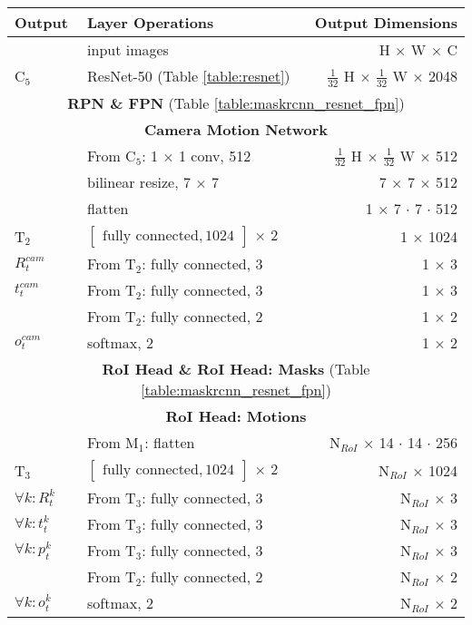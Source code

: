 {
\begin{table}[h]
\centering
\begin{tabular}{llr}
\toprule
\textbf{Output} & \textbf{Layer Operations} & \textbf{Output Dimensions} \\
\midrule\midrule
& input images & H $\times$ W $\times$ C \\
\midrule
C$_5$ & ResNet-50 (Table \ref{table:resnet}) & $\tfrac{1}{32}$ H $\times$ $\tfrac{1}{32}$ W $\times$ 2048 \\
\midrule
\multicolumn{3}{c}{\textbf{RPN \& FPN} (Table \ref{table:maskrcnn_resnet_fpn})} \\
\midrule
\multicolumn{3}{c}{\textbf{Camera Motion Network}}\\
\midrule
& From C$_5$: 1 $\times$ 1 conv, 512 & $\tfrac{1}{32}$ H $\times$ $\tfrac{1}{32}$ W $\times$ 512 \\
& bilinear resize, 7 $\times$ 7 & 7 $\times$ 7 $\times$ 512 \\
& flatten & 1 $\times$ 7 $\cdot$ 7 $\cdot$ 512 \\
T$_2$ & $\begin{bmatrix}\textrm{fully connected}, 1024\end{bmatrix}$ $\times$ 2  & 1 $\times$ 1024 \\
$R_t^{cam}$& From T$_2$: fully connected, 3 & 1 $\times$ 3 \\
$t_t^{cam}$& From T$_2$: fully connected, 3 & 1 $\times$ 3 \\
& From T$_2$: fully connected, 2 & 1 $\times$ 2 \\
$o_t^{cam}$& softmax, 2 & 1 $\times$ 2 \\
\midrule
\multicolumn{3}{c}{\textbf{RoI Head \& RoI Head: Masks} (Table \ref{table:maskrcnn_resnet_fpn})} \\
\midrule
\multicolumn{3}{c}{\textbf{RoI Head: Motions}}\\
\midrule
& From M$_1$: flatten & N$_{RoI}$ $\times$ 14 $\cdot$ 14 $\cdot$ 256 \\
T$_3$ & $\begin{bmatrix}\textrm{fully connected}, 1024\end{bmatrix}$ $\times$ 2 & N$_{RoI}$ $\times$ 1024 \\
$\forall k: R_t^k$ & From T$_3$: fully connected, 3 & N$_{RoI}$ $\times$ 3 \\
$\forall k: t_t^k$ & From T$_3$: fully connected, 3 & N$_{RoI}$ $\times$ 3 \\
$\forall k: p_t^k$ & From T$_3$: fully connected, 3 & N$_{RoI}$ $\times$ 3 \\
& From T$_2$: fully connected, 2 & N$_{RoI}$ $\times$ 2 \\
$\forall k: o_t^k$ & softmax, 2 & N$_{RoI}$ $\times$ 2 \\


\end{tabular}
\end{table}}
